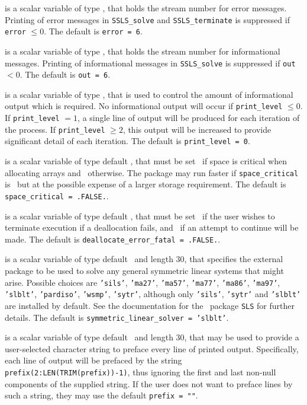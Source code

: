 \documentclass{galahad}
\newcommand{\packagename}{SSLS}
\begin{document}
\begin{description}

 is a scalar variable of type \integer, that holds the
stream number for error messages. Printing of error messages in
{\tt \packagename\_solve} and {\tt \packagename\_terminate}
is suppressed if {\tt error} $\leq 0$.
The default is {\tt error = 6}.

 is a scalar variable of type \integer, that holds the
stream number for informational messages. Printing of informational messages in
{\tt \packagename\_solve} is suppressed if {\tt out} $< 0$.
The default is {\tt out = 6}.

 is a scalar variable of type \integer, that is used
to control the amount of informational output which is required. No
informational output will occur if {\tt print\_level} $\leq 0$. If
{\tt print\_level} $= 1$, a single line of output will be produced for each
iteration of the process. If {\tt print\_level} $\geq 2$, this output will be
increased to provide significant detail of each iteration.
The default is {\tt print\_level = 0}.

 is a scalar variable of type default \logical,
that must be set \true\ if space is critical when allocating arrays
and  \false\ otherwise. The package may run faster if
{\tt space\_critical} is \false\ but at the possible expense of a larger
storage requirement. The default is {\tt space\_critical = .FALSE.}.

 is a scalar variable of type default \logical,
that must be set \true\ if the user wishes to terminate execution if
a deallocation  fails, and \false\ if an attempt to continue
will be made. The default is {\tt deallocate\_error\_fatal = .FALSE.}.

 is a scalar variable of type default \character\
and length 30, that specifies the external package to be used to
solve any general symmetric linear systems that might arise. Possible
choices are
{\tt 'sils'},
{\tt 'ma27'},
{\tt 'ma57'},
{\tt 'ma77'},
{\tt 'ma86'},
{\tt 'ma97'},
{\tt 'slblt'},
{\tt 'pardiso'},
{\tt 'wsmp'},
{\tt 'sytr'},
although only {\tt 'sils'}, {\tt 'sytr'}  and {\tt 'slblt'} are installed by default.
See the documentation for the \galahad\ package {\tt SLS} for further details.
The default is {\tt symmetric\_linear\_solver = 'slblt'}.

 is a scalar variable of type default \character\
and length 30, that may be used to provide a user-selected
character string to preface every line of printed output.
Specifically, each line of output will be prefaced by the string
{\tt prefix(2:LEN(TRIM(prefix))-1)},
thus ignoring the first and last non-null components of the
supplied string. If the user does not want to preface lines by such
a string, they may use the default {\tt prefix = ""}.


\end{description}
\end{document}

